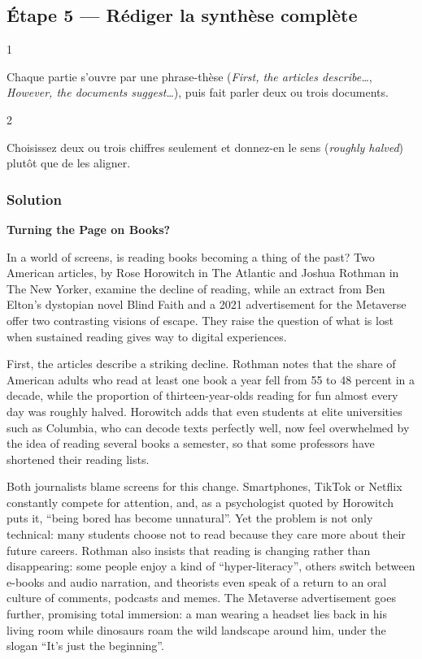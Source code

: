 \documentclass[11pt,a4paper]{article}
\begin{document}
\hypertarget{uxe9tape-5-ruxe9diger-la-synthuxe8se-compluxe8te}{%
\subsection{Étape 5 --- Rédiger la synthèse complète}\label{uxe9tape-5-ruxe9diger-la-synthuxe8se-compluxe8te}}

\begin{indication}{1}

Chaque partie s'ouvre par une phrase-thèse (\emph{First, the articles describe\ldots{}}, \emph{However, the documents suggest\ldots{}}), puis fait parler deux ou trois documents.

\end{indication}

\begin{indication}{2}

Choisissez deux ou trois chiffres seulement et donnez-en le sens (\emph{roughly halved}) plutôt que de les aligner.

\end{indication}

\hypertarget{solution-4}{%
\subsubsection{Solution}\label{solution-4}}

\textbf{Turning the Page on Books?}

In a world of screens, is reading books becoming a thing of the past? Two American articles, by Rose Horowitch in The Atlantic and Joshua Rothman in The New Yorker, examine the decline of reading, while an extract from Ben Elton's dystopian novel Blind Faith and a 2021 advertisement for the Metaverse offer two contrasting visions of escape. They raise the question of what is lost when sustained reading gives way to digital experiences.

First, the articles describe a striking decline. Rothman notes that the share of American adults who read at least one book a year fell from 55 to 48 percent in a decade, while the proportion of thirteen-year-olds reading for fun almost every day was roughly halved. Horowitch adds that even students at elite universities such as Columbia, who can decode texts perfectly well, now feel overwhelmed by the idea of reading several books a semester, so that some professors have shortened their reading lists.

Both journalists blame screens for this change. Smartphones, TikTok or Netflix constantly compete for attention, and, as a psychologist quoted by Horowitch puts it, ``being bored has become unnatural''. Yet the problem is not only technical: many students choose not to read because they care more about their future careers. Rothman also insists that reading is changing rather than disappearing: some people enjoy a kind of ``hyper-literacy'', others switch between e-books and audio narration, and theorists even speak of a return to an oral culture of comments, podcasts and memes. The Metaverse advertisement goes further, promising total immersion: a man wearing a headset lies back in his living room while dinosaurs roam the wild landscape around him, under the slogan ``It's just the beginning''.
\end{document}
